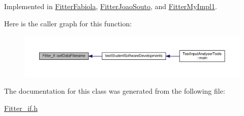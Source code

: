 Implemented in \hyperlink{class_fitter_fabiola_a3edd954df450b042f1989705c5e288ab}{Fitter\-Fabiola}, \hyperlink{class_fitter_joao_souto_a9ec6f95ed55dbc1f6385a24c48bd92b9}{Fitter\-Joao\-Souto}, and \hyperlink{class_fitter_my_impl1_a02c8f65838daa1f086586561aea6e4da}{Fitter\-My\-Impl1}.



Here is the caller graph for this function\-:\nopagebreak
\begin{figure}[H]
\begin{center}
\leavevmode
\includegraphics[width=350pt]{class_fitter__if_aa2d2f13548a09a2f727a4190a6b9c2dd_icgraph}
\end{center}
\end{figure}




The documentation for this class was generated from the following file\-:\begin{DoxyCompactItemize}
\item 
\hyperlink{_fitter__if_8h}{Fitter\-\_\-if.\-h}\end{DoxyCompactItemize}
